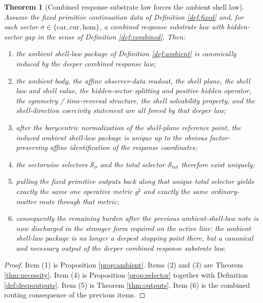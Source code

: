 \documentclass[11pt]{article}
\newcommand{\CompletedMetric}{g^{\sharp}}
\newcommand{\Car}{\mathrm{car}}
\newcommand{\Cur}{\mathrm{cur}}
\newcommand{\Hom}{\mathrm{hom}}
\newcommand{\ChainSelect}[1]{\mathcal S_{#1}}
\newcommand{\ChainSelectTriple}{\mathcal S_{\mathrm{tot}}}
\newtheorem{theorem}{Theorem}
\begin{document}
\begin{theorem}[Combined response substrate law forces the ambient shell law]
\label{thm:main}
Assume the fixed primitive continuation data of Definition \ref{def:fixed} and, for each sector \(\sigma\in\{\Car,\Cur,\Hom\}\), a combined response substrate law with hidden-sector gap in the sense of Definition \ref{def:combined}. Then:
\begin{enumerate}
    \item the ambient shell-law package of Definition \ref{def:ambient} is canonically induced by the deeper combined response law;
    \item the ambient body, the affine observer-data readout, the shell plane, the shell law and shell value, the hidden-sector splitting and positive hidden operator, the symmetry / time-reversal structure, the shell solvability property, and the shell-direction coercivity statement are all forced by that deeper law;
    \item after the barycentric normalization of the shell-plane reference point, the induced ambient shell-law package is unique up to the obvious factor-preserving affine identification of the response coordinates;
    \item the sectorwise selectors \(\ChainSelect{\sigma}\) and the total selector \(\ChainSelectTriple\) therefore exist uniquely;
    \item pulling the fixed primitive outputs back along that unique total selector yields exactly the same one operative metric \(\CompletedMetric\) and exactly the same ordinary-matter route through that metric;
    \item consequently the remaining burden after the previous ambient-shell-law note is now discharged in the stronger form required on the active line: the ambient shell-law package is no longer a deepest stopping point there, but a canonical and necessary output of the deeper combined response substrate law.
\end{enumerate}
\end{theorem}

\begin{proof}
Item (1) is Proposition \ref{prop:ambient}. Items (2) and (3) are Theorem \ref{thm:necessity}. Item (4) is Proposition \ref{prop:selector} together with Definition \ref{def:deepoutputs}. Item (5) is Theorem \ref{thm:outputs}. Item (6) is the combined routing consequence of the previous items.
\end{proof}
\end{document}
